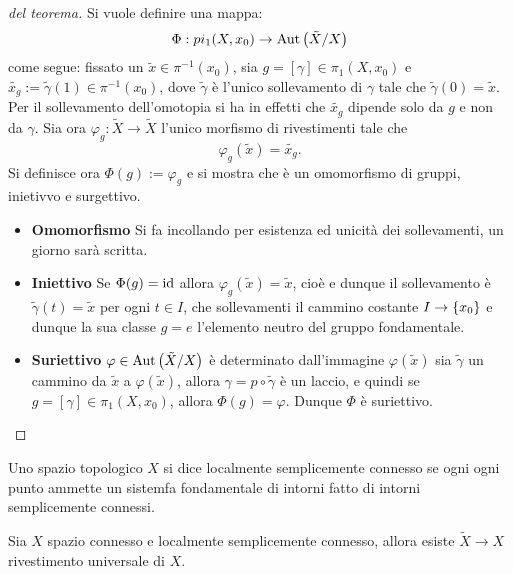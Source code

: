 \documentclass[]{article}
\begin{document}
\begin{proof} [del teorema] \nl
    Si vuole definire una mappa:
    \[
        \Phi: pi_1(X, x_0) \to \mathrm{Aut}\left(\tilde{X}/X\right)
    \]
    come segue: fissato un $\tilde{x} \in \pi^{-1}(x_0)$, sia $g = [\gamma] \in \pi_1(X, x_0)$ e $\tilde{x_g} := \tilde{\gamma}(1) \in \pi^{-1}(x_0)$, dove
    $\tilde{\gamma}$ \`e l'unico sollevamento di $\gamma$ tale che $\tilde{\gamma}(0) = \tilde{x}$. \nl
    Per il sollevamento dell'omotopia si ha in effetti che $\tilde{x_g}$ dipende solo da $g$ e non da $\gamma$. \nl
    Sia ora $\varphi_g: \tilde{X} \to \tilde{X}$ l'unico morfismo di rivestimenti tale che
    \[
        \varphi_g(\tilde{x}) = \tilde{x_g}.
    \]
    Si definisce ora $\Phi(g) := \varphi_g$ e si mostra che \`e un omomorfismo di gruppi, inietivvo e surgettivo. \nl
    \begin{itemize}
        \item \textbf{Omomorfismo} \nl
            Si fa incollando per esistenza ed unicit\`a dei sollevamenti, un giorno sar\`a scritta.
        \item \textbf{Iniettivo} \nl
            Se $\Phi(g) = \mathrm{id}$ allora $\varphi_g(\tilde{x}) = \tilde{x}$, cio\`e e dunque il sollevamento \`e $\tilde{\gamma}(t) = \tilde{x}$ per ogni $t \in I$, che sollevamenti
            il cammino costante $I \to \left\{ x_0 \right\}$ e dunque la sua classe $g = e$ l'elemento neutro del gruppo fondamentale. 
        \item \textbf{Suriettivo} \nl
            $\varphi \in \mathrm{Aut}\left(\tilde{X}/X\right)$ \`e determinato dall'immagine $\varphi(\tilde{x})$ sia $\tilde{\gamma}$ un cammino da 
            $\tilde{x}$ a $\varphi(\tilde{x})$, allora $\gamma = p \circ \tilde{\gamma}$ \`e un laccio, e quindi se $g = [\gamma] \in \pi_1(X, x_0)$, allora
            $\Phi(g) = \varphi$.
            Dunque $\Phi$ \`e suriettivo.
    \end{itemize}
\end{proof}

\begin{definition}  \nl
    Uno spazio topologico $X$ si dice localmente semplicemente connesso se ogni ogni punto ammette un sistemfa fondamentale
    di intorni fatto di intorni semplicemente connessi.
\end{definition}

\begin{theorem}  \nl
    Sia $X$ spazio connesso e localmente semplicemente connesso, allora esiste $\tilde{X} \to X$ rivestimento universale di $X$.
\end{theorem}
\end{document}
